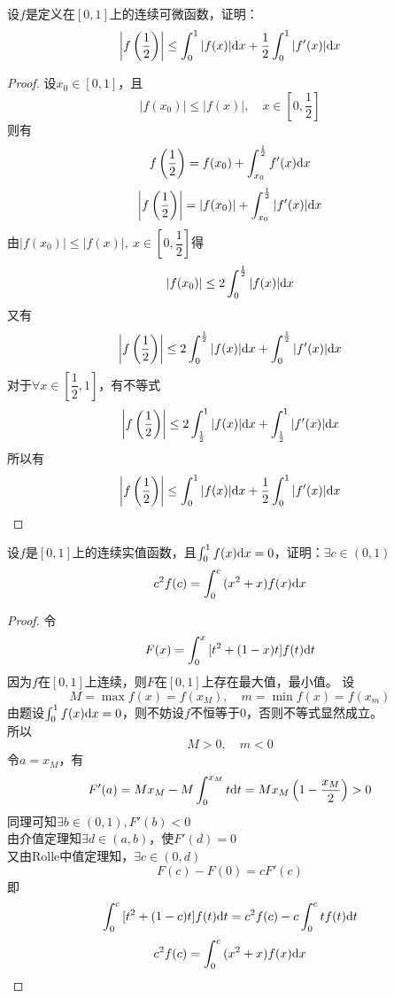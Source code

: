 \begin{proposition}
    
    设$f$是定义在$[0,1]$上的连续可微函数，证明：
    $$\left|f\left(\dfrac{1}{2}\right)\right| \leq \int_{0}^{1}{|f(x)|}\mathrm{d} x + \dfrac{1}{2} \int_{0}^{1}{|f'(x)|}\mathrm{d} x$$

\end{proposition}

\begin{proof}

    设$x_0 \in [0,1]$，且
    $$|f(x_0)| \leq |f(x)|, \quad x \in \left[0,\dfrac{1}{2}\right]$$
    则有
    $$f\left(\dfrac{1}{2}\right) = f(x_0) + \int_{x_0}^{\frac{1}{2}}{f'(x)}\mathrm{d} x$$
    $$\left|f\left(\dfrac{1}{2}\right)\right|= |f(x_0)| + \int_{x_0}^{\frac{1}{2}}{|f'(x)|}\mathrm{d} x$$
    由$|f(x_0)| \leq |f(x)|, \ x \in \left[0,\dfrac{1}{2}\right]$得
    $$|f(x_0)| \leq 2 \int_{0}^{\frac{1}{2}}{|f(x)|}\mathrm{d} x$$
    又有
    $$\left|f\left(\dfrac{1}{2}\right)\right| \leq 2\int_{0}^{\frac{1}{2}}{|f(x)|}\mathrm{d} x + \int_{0}^{\frac{1}{2}}{|f'(x)|}\mathrm{d} x$$
    对于$\forall x \in [\dfrac{1}{2}, 1]$，有不等式
    $$\left|f\left(\dfrac{1}{2}\right)\right| \leq 2\int_{\frac{1}{2}}^{1}{|f(x)|}\mathrm{d} x + \int_{\frac{1}{2}}^{1}{|f'(x)|}\mathrm{d} x$$
    所以有
    $$\left|f\left(\dfrac{1}{2}\right)\right| \leq \int_{0}^{1}{|f(x)|}\mathrm{d} x + \dfrac{1}{2} \int_{0}^{1}{|f'(x)|}\mathrm{d} x$$

\end{proof}

\begin{proposition}

    设$f$是$[0,1]$上的连续实值函数，且$\int_{0}^{1}{f(x)}\mathrm{d} x = 0$，证明：$\exists c \in (0,1)$
    $$c^2f(c) = \int_{0}^{c}{(x^2 + x)f(x)}\mathrm{d} x$$

\end{proposition}

\begin{proof}
    
    令
    $$F(x) = \int_{0}^{x}{[t^2 + (1 - x)t]f(t)}\mathrm{d} t$$
    因为$f$在$[0,1]$上连续，则$F$在$[0,1]$上存在最大值，最小值。
    设
    $$M = \max{f(x)} = f(x_M),\quad m = \min{f(x)} = f(x_m)$$
    由题设$\int_{0}^{1}{f(x)}\mathrm{d} x = 0$，则不妨设$f$不恒等于$0$，否则不等式显然成立。\\
    所以
    $$M > 0, \quad m < 0$$
    令$a = x_M$，有
    $$F'(a) = Mx_M - M\int_{0}^{x_M}{t}\mathrm{d} t = Mx_M \left(1 - \dfrac{x_M}{2} \right) > 0$$
    同理可知$\exists b \in (0,1), F'(b) < 0$\\
    由介值定理知$\exists d \in (a,b)$，使$F'(d) = 0$\\
    又由\textup{Rolle}中值定理知，$\exists c \in (0,d)$
    $$F(c) - F(0) = cF'(c)$$
    即
    $$\int_{0}^{c}{[t^2 + (1 - c)t]f(t)}\mathrm{d} t =  c^2f(c) - c\int_{0}^{c}{tf(t)}\mathrm{d} t$$
    $$c^2f(c) = \int_{0}^{c}{(x^2 + x)f(x)}\mathrm{d} x$$

\end{proof}

